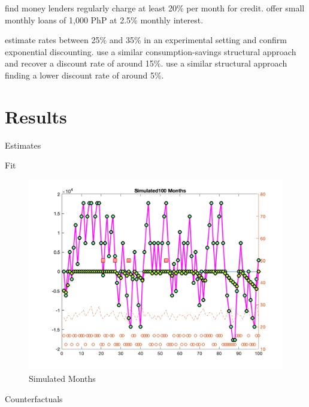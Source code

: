 \documentclass[12pt]{article}
\begin{document}


\cite{karlan2009expanding} find money lenders regularly charge at least 20\% per month for credit.  \cite{gine2014group} offer small monthly loans of 1,000 PhP at 2.5\% monthly interest.

\cite{andreoni2012estimating} estimate rates between 25\% and 35\% in an experimental setting and confirm exponential discounting.  \cite{laibson2007estimating} use a similar consumption-savings structural approach and recover a discount rate of around 15\%.  \cite{gourinchas2002consumption} use a similar structural approach finding a lower discount rate of around 5\%.






\section{Results}

\begin{table}
\centering
\caption{Estimates}\label{table:estimates}

\end{table}

\begin{table}
\centering
\caption{Fit}\label{table:fit}

\end{table}

\begin{figure}
\centering
\caption{Simulated Months}\label{figure:deaton}
\includegraphics[scale=.5]{tables/deaton.png}
\end{figure}

\begin{table}
\centering
\caption{Counterfactuals}\label{table:counter}

\end{table}


\nocite{*}
\singlespacing
\setlength{\bibsep}{7pt}


\end{document}
